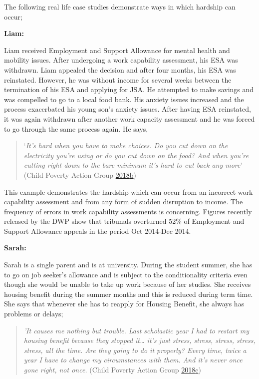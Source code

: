 \documentclass[]{tufte-handout}
\begin{document}
The following real life case studies demonstrate ways in which hardship
can occur;

\textbf{Liam:}

Liam received Employment and Support Allowance for mental health and
mobility issues. After undergoing a work capability assessment, his ESA
was withdrawn. Liam appealed the decision and after four months, his ESA
was reinstated. However, he was without income for several weeks between
the termination of his ESA and applying for JSA. He attempted to make
savings and was compelled to go to a local food bank. His anxiety issues
increased and the process exacerbated his young son's anxiety issues.
After having ESA reinstated, it was again withdrawn after another work
capacity assessment and he was forced to go through the same process
again. He says,

\begin{quote}
`\emph{It's hard when you have to make choices. Do you cut down on the
electricity you're using or do you cut down on the food? And when you're
cutting right down to the bare minimum it's hard to cut back any more}'
(Child Poverty Action Group
\protect\hyperlink{ref-ChildPovertyActionGroupa}{2018}\protect\hyperlink{ref-ChildPovertyActionGroupa}{b})
\end{quote}

This example demonstrates the hardship which can occur from an incorrect
work capability assessment and from any form of sudden disruption to
income. The frequency of errors in work capability assessments is
concerning. Figures recently released by the DWP show that tribunals
overturned 52\% of Employment and Support Allowance appeals in the
period Oct 2014-Dec 2014.

\textbf{Sarah: }

Sarah is a single parent and is at university. During the student
summer, she has to go on job seeker's allowance and is subject to the
conditionality criteria even though she would be unable to take up work
because of her studies. She receives housing benefit during the summer
months and this is reduced during term time. She says that whenever she
has to reapply for Housing Benefit, she always has problems or delays;

\begin{quote}
\emph{'It causes me nothing but trouble. Last scholastic year I had to
restart my housing benefit because they stopped it\ldots{} it's just
stress, stress, stress, stress, stress, all the time. Are they going to
do it properly? Every time, twice a year I have to change my
circumstances with them. And it's never once gone right, not once.}
(Child Poverty Action Group
\protect\hyperlink{ref-ChildPovertyActionGroup}{2018}\protect\hyperlink{ref-ChildPovertyActionGroup}{c})
\end{quote}
\end{document}

